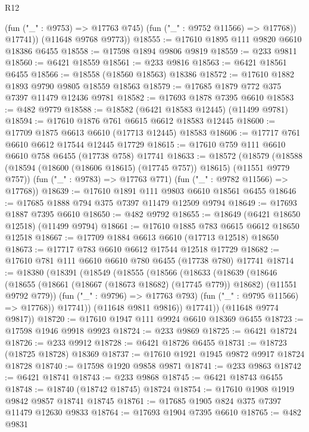 \begin{lexlean}{R12}
\begin{coremodule}
            (fun ("_" : @9753) => @17763 @745)
            (fun ("_" : @9752 @11566) => @17768))
          @17741))
      (@11648 @9768 @9773))
@18555 := @17610 @1895 @111 @9820 @6610 @18386 @6455
@18558 := @17598 @1894 @9806 @9819
@18559 := @233 @9811
@18560 := @6421 @18559
@18561 := @233 @9816
@18563 := @6421 @18561 @6455
@18566 := @18558 (@18560 @18563) @18386
@18572 := @17610 @1882 @1893 @9790 @9805 @18559 @18563
@18579 := @17685 @1879 @772 @375 @7397 @11479 @12436 @9781
@18582 := @17693 @1878 @7395 @6610
@18583 := @482 @9779
@18588 := @18582 (@6421 @18583 @12445) (@11499 @9781)
@18594 := @17610 @1876 @761 @6615 @6612 @18583 @12445
@18600 := @17709 @1875 @6613 @6610 (@17713 @12445) @18583
@18606 := @17717 @761 @6610 @6612 @17544 @12445 @17729
@18615 := @17610 @759 @111 @6610 @6610 @758 @6455 (@17738 @758) @17741
@18633 := @18572
    (@18579
      (@18588 (@18594 (@18600 (@18606 @18615) (@17745 @757)) @18615) (@11551 @9779 @757))
      (fun ("_" : @9783) => @17763 @771)
      (fun ("_" : @9782 @11566) => @17768))
@18639 := @17610 @1891 @111 @9803 @6610 @18561 @6455
@18646 := @17685 @1888 @794 @375 @7397 @11479 @12509 @9794
@18649 := @17693 @1887 @7395 @6610
@18650 := @482 @9792
@18655 := @18649 (@6421 @18650 @12518) (@11499 @9794)
@18661 := @17610 @1885 @783 @6615 @6612 @18650 @12518
@18667 := @17709 @1884 @6613 @6610 (@17713 @12518) @18650
@18673 := @17717 @783 @6610 @6612 @17544 @12518 @17729
@18682 := @17610 @781 @111 @6610 @6610 @780 @6455 (@17738 @780) @17741
@18714 := @18380
    (@18391
      (@18549
        (@18555
          (@18566
            (@18633
              (@18639
                (@18646
                  (@18655
                    (@18661 (@18667 (@18673 @18682) (@17745 @779)) @18682)
                    (@11551 @9792 @779))
                  (fun ("_" : @9796) => @17763 @793)
                  (fun ("_" : @9795 @11566) => @17768))
                @17741))
            (@11648 @9811 @9816))
          @17741))
      (@11648 @9774 @9817))
@18720 := @17610 @1947 @111 @9924 @6610 @18369 @6455
@18723 := @17598 @1946 @9918 @9923
@18724 := @233 @9869
@18725 := @6421 @18724
@18726 := @233 @9912
@18728 := @6421 @18726 @6455
@18731 := @18723 (@18725 @18728) @18369
@18737 := @17610 @1921 @1945 @9872 @9917 @18724 @18728
@18740 := @17598 @1920 @9858 @9871
@18741 := @233 @9863
@18742 := @6421 @18741
@18743 := @233 @9868
@18745 := @6421 @18743 @6455
@18748 := @18740 (@18742 @18745) @18724
@18754 := @17610 @1908 @1919 @9842 @9857 @18741 @18745
@18761 := @17685 @1905 @824 @375 @7397 @11479 @12630 @9833
@18764 := @17693 @1904 @7395 @6610
@18765 := @482 @9831

\end{coremodule}
\end{lexlean}
